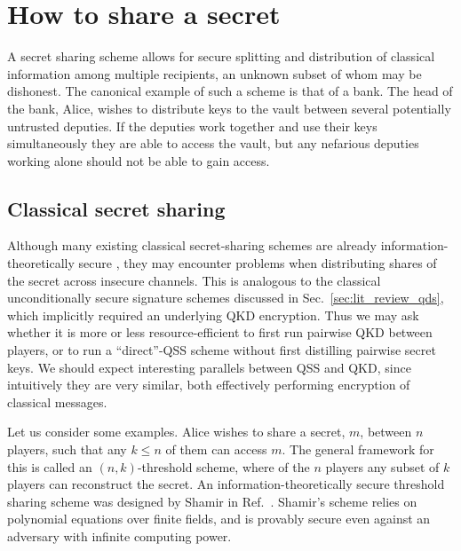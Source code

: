 \section{How to share a secret}\label{sec:qss_lit_review}
A secret sharing scheme allows for secure splitting and distribution of classical information among multiple recipients, an unknown subset of whom may be dishonest. The canonical example of such a scheme is that of a bank. The head of the bank, Alice, wishes to distribute keys to the vault between several potentially untrusted deputies. If the deputies work together and use their keys simultaneously they are able to access the vault, but any nefarious deputies working alone should not be able to gain access.




\subsection{Classical secret sharing}\label{sec:qss_qcss}
Although many existing classical secret-sharing schemes are already information-theoretically secure \cite{Shamir1979, Blakley1979}, they may encounter problems when distributing  shares of the secret across insecure channels. This is analogous to the classical unconditionally secure signature schemes \cite{Wallden2015, Amiri2016a} discussed in Sec.~\ref{sec:lit_review_qds}, which implicitly required an underlying QKD encryption. Thus we may ask whether it is more or less resource-efficient to first run pairwise QKD between players, or to run a ``direct''-QSS scheme without first distilling pairwise secret keys. We should expect interesting parallels between QSS and QKD, since intuitively they are very similar, both effectively performing encryption of classical messages.

Let us consider some examples. Alice wishes to share a secret, $m$, between $n$ players, such that any $k \le n$ of them can access $m$. The general framework for this is called an $\left(n, k\right)$-threshold scheme, where of the $n$ players any subset of $k$ players can reconstruct the secret. An information-theoretically secure threshold sharing scheme was designed by Shamir in Ref.~\cite{Shamir1979}. Shamir's scheme relies on polynomial equations over finite fields, and is provably secure even against an adversary with infinite computing power. 


